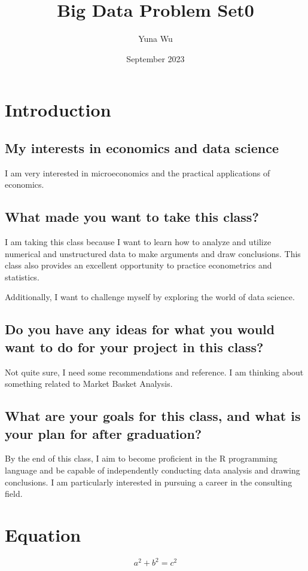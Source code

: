 \documentclass{article}
\title{Big Data Problem Set0}
\author{Yuna Wu}
\date{September 2023}
\begin{document}
\maketitle

\section{Introduction}
\subsection{My interests in economics and data science}

	\item I am very interested in microeconomics and the practical applications of economics.


\subsection{What made you want to take this class?}


	\item I am taking this class because I want to learn how to analyze and utilize numerical and unstructured data to make arguments and draw conclusions. This class also provides an excellent opportunity to practice econometrics and statistics.

	\item Additionally, I want to challenge myself by exploring the world of data science.



\subsection{Do you have any ideas for what you would want to do for your project in this class?}
\item Not quite sure, I need some recommendations and reference. I am thinking about something related to Market Basket Analysis.



\subsection{What are your goals for this class, and what is your plan for after graduation?}


	\item By the end of this class, I aim to become proficient in the R programming language and be capable of independently conducting data analysis and drawing conclusions. I am particularly interested in pursuing a career in the consulting field.




\section{Equation}
\[a^2+b^2=c^2\]
\end{document}

